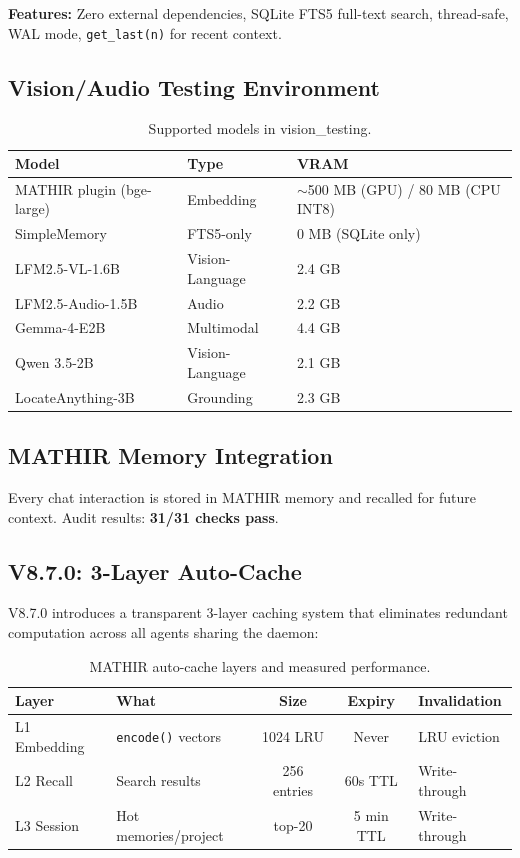 \documentclass[12pt,a4paper]{article}
\theoremstyle{definition}
\theoremstyle{remark}
\newcommand{\MATHIR}{\textsc{MATHIR}}
\begin{document}
\textbf{Features:} Zero external dependencies, SQLite FTS5 full-text search, thread-safe, WAL mode, \texttt{get\_last(n)} for recent context.

\subsection{Vision/Audio Testing Environment}

\begin{table}[H]
\centering
\caption{Supported models in vision\_testing.}
\label{tab:models}
\begin{tabular}{lll}
\toprule
\textbf{Model} & \textbf{Type} & \textbf{VRAM} \\
\midrule
MATHIR plugin (bge-large) & Embedding & $\sim$500 MB (GPU) / 80 MB (CPU INT8) \\
SimpleMemory & FTS5-only & 0 MB (SQLite only) \\
LFM2.5-VL-1.6B & Vision-Language & 2.4 GB \\
LFM2.5-Audio-1.5B & Audio & 2.2 GB \\
Gemma-4-E2B & Multimodal & 4.4 GB \\
Qwen 3.5-2B & Vision-Language & 2.1 GB \\
LocateAnything-3B & Grounding & 2.3 GB \\
\bottomrule
\end{tabular}
\end{table}

\subsection{MATHIR Memory Integration}

Every chat interaction is stored in \MATHIR{} memory and recalled for future context. Audit results: \textbf{31/31 checks pass}.

\subsection{V8.7.0: 3-Layer Auto-Cache}

V8.7.0 introduces a transparent 3-layer caching system that eliminates redundant computation across all agents sharing the daemon:

\begin{table}[H]
\centering
\caption{MATHIR auto-cache layers and measured performance.}
\label{tab:cache}
\begin{tabular}{llccl}
\toprule
\textbf{Layer} & \textbf{What} & \textbf{Size} & \textbf{Expiry} & \textbf{Invalidation} \\
\midrule
L1 Embedding & \texttt{encode()} vectors & 1024 LRU & Never & LRU eviction \\
L2 Recall & Search results & 256 entries & 60s TTL & Write-through \\
L3 Session & Hot memories/project & top-20 & 5 min TTL & Write-through \\
\bottomrule
\end{tabular}
\end{table}
\end{document}
